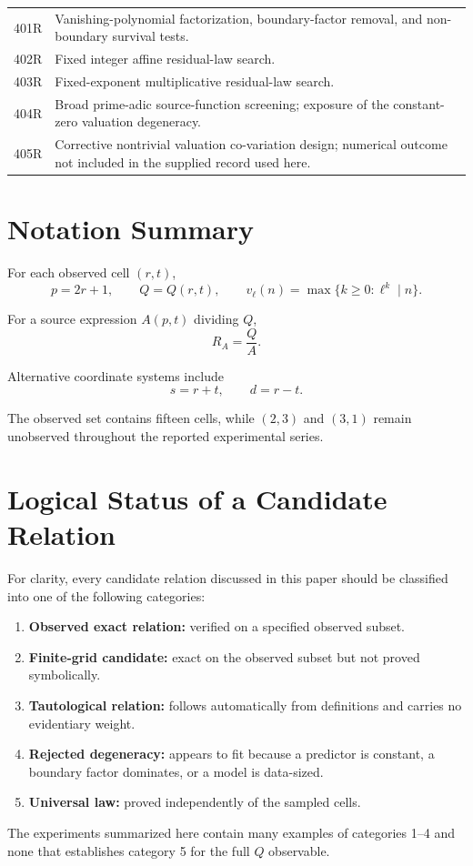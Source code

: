 \documentclass[11pt,a4paper]{article}
\begin{document}
\begin{longtable}{p{}p{}}
401R & Vanishing-polynomial factorization, boundary-factor removal, and non-boundary survival tests.\\
402R & Fixed integer affine residual-law search.\\
403R & Fixed-exponent multiplicative residual-law search.\\
404R & Broad prime-adic source-function screening; exposure of the constant-zero valuation degeneracy.\\
405R & Corrective nontrivial valuation co-variation design; numerical outcome not included in the supplied record used here.\\
\bottomrule
\end{longtable}

\section{Notation Summary}

For each observed cell $(r,t)$,
\[
p=2r+1,
\qquad
Q=Q(r,t),
\qquad
v_\ell(n)=\max\{k\ge0:\ell^k\mid n\}.
\]

For a source expression $A(p,t)$ dividing $Q$,
\[
R_A=\frac{Q}{A}.
\]

Alternative coordinate systems include
\[
s=r+t,\qquad d=r-t.
\]

The observed set contains fifteen cells, while $(2,3)$ and $(3,1)$ remain unobserved throughout the reported experimental series.

\section{Logical Status of a Candidate Relation}

For clarity, every candidate relation discussed in this paper should be classified into one of the following categories:

\begin{enumerate}[leftmargin=1.5em]
  \item \textbf{Observed exact relation:} verified on a specified observed subset.
  \item \textbf{Finite-grid candidate:} exact on the observed subset but not proved symbolically.
  \item \textbf{Tautological relation:} follows automatically from definitions and carries no evidentiary weight.
  \item \textbf{Rejected degeneracy:} appears to fit because a predictor is constant, a boundary factor dominates, or a model is data-sized.
  \item \textbf{Universal law:} proved independently of the sampled cells.
\end{enumerate}

The experiments summarized here contain many examples of categories 1--4 and none that establishes category 5 for the full $Q$ observable.
\end{document}
